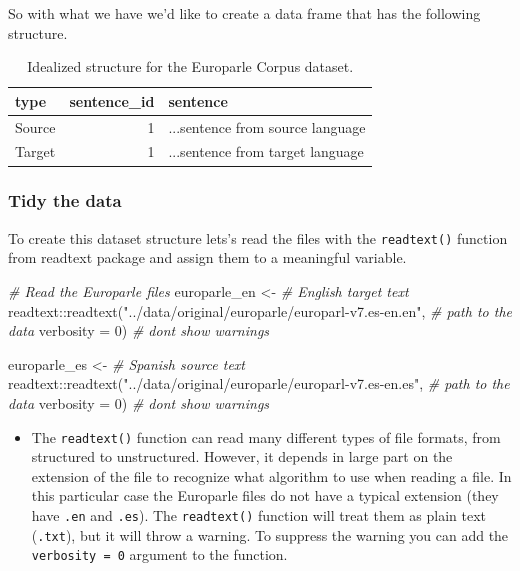 \documentclass[
]{article}
\newenvironment{Shaded}{\begin{snugshade}}{\end{snugshade}}
\newcommand{\AttributeTok}[1]{\textcolor[rgb]{0.77,0.63,0.00}{#1}}
\newcommand{\CommentTok}[1]{\textcolor[rgb]{0.56,0.35,0.01}{\textit{#1}}}
\newcommand{\DecValTok}[1]{\textcolor[rgb]{0.00,0.00,0.81}{#1}}
\newcommand{\FunctionTok}[1]{\textcolor[rgb]{0.00,0.00,0.00}{#1}}
\newcommand{\NormalTok}[1]{#1}
\newcommand{\OtherTok}[1]{\textcolor[rgb]{0.56,0.35,0.01}{#1}}
\newcommand{\SpecialCharTok}[1]{\textcolor[rgb]{0.00,0.00,0.00}{#1}}
\newcommand{\StringTok}[1]{\textcolor[rgb]{0.31,0.60,0.02}{#1}}
\newenvironment{rmdblock}[1]
  {\begin{shaded*}
  \begin{itemize}
  \renewcommand{\labelitemi}{
    \raisebox{-.5\height}[0pt][0pt]{
      {\setkeys{Gin}{width=2em,keepaspectratio}\texttt{[image: assets/images/\#1]}}
    }
  }
  \item
  }
  {
  \end{itemize}
  \end{shaded*}
  }
\newenvironment{rmdtip}
  {\begin{rmdblock}{tip}}
  {\end{rmdblock}}
\begin{document}
So with what we have we'd like to create a data frame that has the following structure.

\begin{table}

\caption{\label{tab:cd-unstructured-europarle-structure-example}Idealized structure for the Europarle Corpus dataset.}
\centering
\begin{tabular}[t]{lrl}
\toprule
type & sentence\_id & sentence\\
\midrule
Source & 1 & ...sentence from source language\\
Target & 1 & ...sentence from target language\\
\bottomrule
\end{tabular}
\end{table}

\hypertarget{tidy-the-data}{%
\subsubsection{Tidy the data}\label{tidy-the-data}}

To create this dataset structure lets's read the files with the \texttt{readtext()} function from readtext package and assign them to a meaningful variable.

\begin{Shaded}
\begin{Highlighting}[]
\CommentTok{\# Read the Europarle files}
\NormalTok{europarle\_en }\OtherTok{\textless{}{-}}  \CommentTok{\# English target text}
\NormalTok{  readtext}\SpecialCharTok{::}\FunctionTok{readtext}\NormalTok{(}\StringTok{"../data/original/europarle/europarl{-}v7.es{-}en.en"}\NormalTok{, }\CommentTok{\# path to the data}
                     \AttributeTok{verbosity =} \DecValTok{0}\NormalTok{) }\CommentTok{\# don\textquotesingle{}t show warnings}

\NormalTok{europarle\_es }\OtherTok{\textless{}{-}} \CommentTok{\# Spanish source text}
\NormalTok{  readtext}\SpecialCharTok{::}\FunctionTok{readtext}\NormalTok{(}\StringTok{"../data/original/europarle/europarl{-}v7.es{-}en.es"}\NormalTok{, }\CommentTok{\# path to the data}
                     \AttributeTok{verbosity =} \DecValTok{0}\NormalTok{) }\CommentTok{\# don\textquotesingle{}t show warnings}
\end{Highlighting}
\end{Shaded}

\begin{rmdtip}
The \texttt{readtext()} function can read many different types of file
formats, from structured to unstructured. However, it depends in large
part on the extension of the file to recognize what algorithm to use
when reading a file. In this particular case the Europarle files do not
have a typical extension (they have \texttt{.en} and \texttt{.es}). The
\texttt{readtext()} function will treat them as plain text
(\texttt{.txt}), but it will throw a warning. To suppress the warning
you can add the \texttt{verbosity\ =\ 0} argument to the function.
\end{rmdtip}
\end{document}

